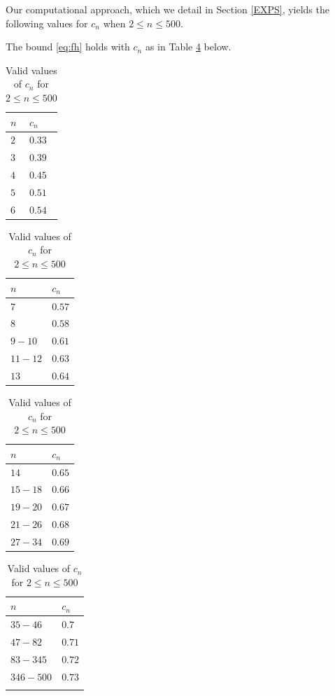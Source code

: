 \documentclass[12pt]{amsart}
\begin{document}
Our computational approach, which we detail in Section \ref{EXPS}, yields the following values for $c_n$ when $2\le n\le 500$. 
\begin{lemma}
\label{lemma:fsmall}
The bound \eqref{eq:fh} holds with $c_n$ as in Table \ref{tab:cn1} below.
\begin{table}[H]
\caption{Valid values of $c_n$ for $2\le n\le 500$}  
\label{tab:cn1}  
\centering
    \begin{tabular}{ | l | l | }
    \hline
    $n$ & $c_n$   \\  
    \hline
    $2$& $0.33$    \\  
    \hline
    $3$& $0.39$ \\
    \hline
    $4$& $0.45$ \\
    \hline
    $5$& $0.51$  \\
    \hline
    $6$& $0.54$  \\
    \hline
    \end{tabular}
     \begin{tabular}{ | l | l | }
    \hline
    $n$ & $c_n$    \\
    \hline
    $7$ & $0.57$  \\
    \hline
    $8$& $0.58$  \\
    \hline
     $9-10$ &  $0.61$  \\  
    \hline
    $11-12$ & $0.63$  \\
    \hline
    $13$& $0.64$ \\
    \hline
    \end{tabular}
     \begin{tabular}{ | l | l | }
    \hline
     $n $ & $c_n$  \\ 
     \hline
    $14$ &$0.65$ \\
    \hline
    $15-18$ &$0.66$ \\
    \hline
    $19-20$ &$0.67$ \\
    \hline
    $21-26$ &$0.68$\\
    \hline
    $27-34$ & $0.69$ \\  
    \hline
    \end{tabular}
    \begin{tabular}{ | l | l | }
    \hline
    $n$ & $c_n$   \\  
    \hline
    $35-46$ & $0.7$\\
    \hline
    $47-82$ & $0.71$\\
    \hline
    $83-345$ & $0.72$\\
    \hline
    $346-500$ & $0.73$\\
    \hline
    &\\
    \hline
    \end{tabular}
\end{table}
\end{lemma}
\end{document}
